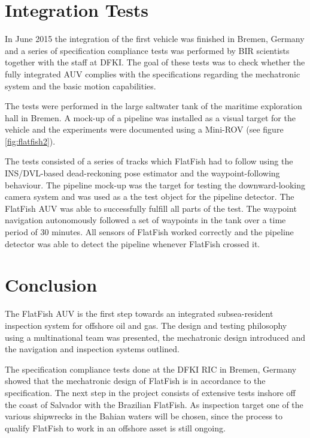 \documentclass[conference]{IEEEtran}
\begin{document}
\section{Integration Tests}

In June 2015 the integration of the first vehicle was finished in Bremen, Germany and a
series of specification compliance tests was performed by BIR scientists together with the 
staff at DFKI. The goal of these tests was to check whether the fully integrated AUV 
complies with the specifications regarding the mechatronic system and the basic motion 
capabilities. 

The tests were performed in the large saltwater tank of the maritime exploration hall in Bremen.
A mock-up of a pipeline was installed as a visual target for the vehicle and the
experiments were documented using a Mini-ROV (see figure \ref{fig:flatfish2}). 

The tests consisted of a series of tracks which FlatFish had to follow using the
INS/DVL-based dead-reckoning pose estimator and the waypoint-following behaviour. The
pipeline mock-up was the target for testing the downward-looking camera system and was 
used as a the test object for the pipeline detector. The FlatFish AUV was able to successfully
fulfill all parts of the test. The waypoint navigation autonomously followed a set of
waypoints in the tank over a time period of 30 minutes. All sensors of FlatFish
worked correctly and the pipeline detector was able to detect the pipeline whenever
FlatFish crossed it. 

\section{Conclusion}

The FlatFish AUV is the first step towards an integrated subsea-resident inspection system for
offshore oil and gas. The design and testing philosophy using a multinational team was 
presented, the mechatronic design introduced and the navigation and inspection 
systems outlined. 

The specification compliance tests done at the DFKI RIC in Bremen,
Germany showed that the mechatronic design of FlatFish is in accordance to the 
specification. The next step in the project consists of extensive tests inshore off the coast of 
Salvador with the Brazilian FlatFish. As inspection target one of the various shipwrecks in 
the Bahian waters will be chosen, since the process to qualify FlatFish to work in an offshore 
asset is still ongoing. 
\end{document}
